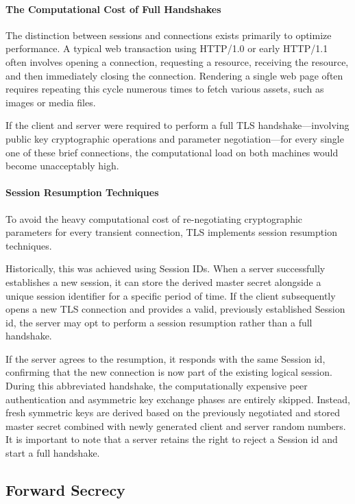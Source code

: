 
\paragraph{The Computational Cost of Full Handshakes}
The distinction between sessions and connections exists primarily to optimize performance. A typical web transaction using HTTP/1.0 or early HTTP/1.1 often involves opening a connection, requesting a resource, receiving the resource, and then immediately closing the connection. Rendering a single web page often requires repeating this cycle numerous times to fetch various assets, such as images or media files.

If the client and server were required to perform a full TLS handshake—involving public key cryptographic operations and parameter negotiation—for every single one of these brief connections, the computational load on both machines would become unacceptably high.

\paragraph{Session Resumption Techniques}
To avoid the heavy computational cost of re-negotiating cryptographic parameters for every transient connection, TLS implements session resumption techniques.

Historically, this was achieved using Session IDs. When a server successfully establishes a new session, it can store the derived master secret alongside a unique session identifier for a specific period of time. If the client subsequently opens a new TLS connection and provides a valid, previously established Session id, the server may opt to perform a session resumption rather than a full handshake.

If the server agrees to the resumption, it responds with the same Session id, confirming that the new connection is now part of the existing logical session. During this abbreviated handshake, the computationally expensive peer authentication and asymmetric key exchange phases are entirely skipped. Instead, fresh symmetric keys are derived based on the previously negotiated and stored master secret combined with newly generated client and server random numbers. It is important to note that a server retains the right to reject a Session id and start a full handshake.

\subsection{Forward Secrecy}

